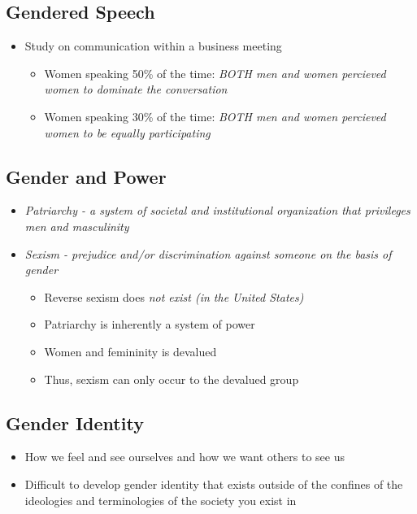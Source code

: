 \documentclass{article}
\begin{document}
\subsection{Gendered Speech}
\begin{itemize}
  \item Study on communication within a business meeting \begin{itemize}
    \item Women speaking 50\% of the time: \it{BOTH} men and women percieved women to dominate the conversation
    \item Women speaking 30\% of the time: \it{BOTH} men and women percieved women to be equally participating
  \end{itemize}
\end{itemize}

\subsection{Gender and Power}
\begin{itemize}
  \item \it{Patriarchy} - a system of societal and institutional organization that privileges men and masculinity
  \item \it{Sexism} - prejudice and/or discrimination against someone on the basis of gender \begin{itemize}
    \item Reverse sexism does \it{not} exist (in the United States)
    \item Patriarchy is inherently a system of power
    \item Women and femininity is devalued
    \item Thus, sexism can only occur to the devalued group
  \end{itemize}
\end{itemize}

\subsection{Gender Identity}
\begin{itemize}
  \item How we feel and see ourselves and how we want others to see us
  \item Difficult to develop gender identity that exists outside of the confines of the ideologies and terminologies of the society you exist in
\end{itemize}
\end{document}
